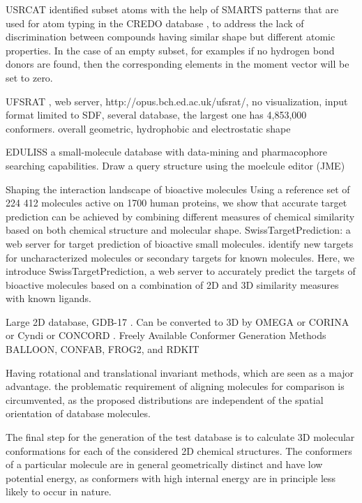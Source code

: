 USRCAT \citep{1331} identified subset atoms with the help of SMARTS patterns that are used for atom typing in the CREDO database \citep{522}, to address the lack of discrimination between compounds having similar shape but different atomic properties. In the case of an empty subset, for examples if no hydrogen bond donors are found, then the corresponding elements in the moment vector will be set to zero.

UFSRAT \citep{1436}, web server, http://opus.bch.ed.ac.uk/ufsrat/, no visualization, input format limited to SDF, several database, the largest one has 4,853,000 conformers. overall geometric, hydrophobic and electrostatic shape

\citep{1437} EDULISS a small-molecule database with data-mining and pharmacophore searching capabilities. Draw a query structure using the moelcule editor (JME)

\citep{1407} Shaping the interaction landscape of bioactive molecules
\citep{1407} Using a reference set of 224 412 molecules active on 1700 human proteins, we show that accurate target prediction can be achieved by combining different measures of chemical similarity based on both chemical structure and molecular shape.
\citep{1408} SwissTargetPrediction: a web server for target prediction of bioactive small molecules. identify new targets for uncharacterized molecules or secondary targets for known molecules. Here, we introduce SwissTargetPrediction, a web server to accurately predict the targets of bioactive molecules based on a combination of 2D and 3D similarity measures with known ligands.

Large 2D database, GDB-17 \citep{1276}. Can be converted to 3D by OMEGA \citep{462} or CORINA \citep{1392} or Cyndi \citep{1393,1394} or CONCORD \citep{}. Freely Available Conformer Generation Methods \citep{1127} BALLOON, CONFAB, FROG2, and RDKIT

Having rotational and translational invariant methods, which are seen as a major advantage. the problematic requirement of aligning molecules for comparison is circumvented, as the proposed distributions are independent of the spatial orientation of database molecules.

The final step for the generation of the test database is to calculate 3D molecular conformations for each of the considered 2D chemical structures. The conformers of a particular molecule are in general geometrically distinct and have low potential energy, as conformers with high internal energy are in principle less likely to occur in nature.

